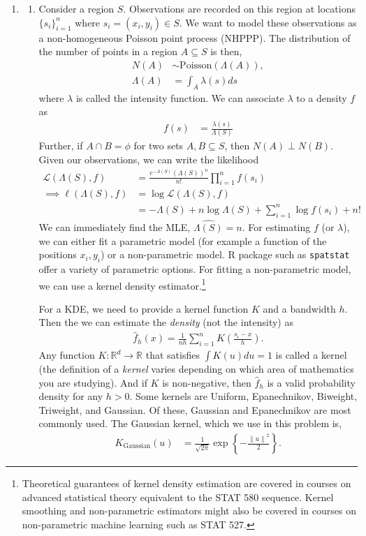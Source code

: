 \documentclass[11pt]{article}
\newcommand{\norm}[1]{\left\lVert#1\right\rVert}
\newcommand{\g}[1][G]{\mathcal{#1}}
\begin{document}
\begin{enumerate}
\clearpage
\item
\begin{enumerate}
\item Consider a region $S$. Observations are recorded on this region at locations $\{s_i\}_{i=1}^n$ where $s_i = (x_i, y_i) \in S$. We want to model these observations as a non-homogeneous Poisson point process (NHPPP). The distribution of the number of points in a region $A \subseteq S$ is then,
\begin{align*}
	N(A) &\sim \text{Poisson}(\Lambda(A)), \\
	\Lambda(A) &= \int_A \lambda(s) ds
\end{align*}
where $\lambda$ is called the intensity function. We can associate $\lambda$ to a density $f$ as
\begin{align*}
	f(s) &= \frac{\lambda(s)}{\Lambda(S)}
\end{align*}
Further, if $A \cap B = \phi$ for two sets $A, B \subseteq S$, then $N(A) \perp N(B)$. Given our observations, we can write the likelihood
\begin{align}
	\g[L](\Lambda(S), f) &= \frac{e^{-\Lambda(S)} (\Lambda(S))^n}{n!} \prod_{i=1}^n f(s_i) \label{eq:like} \\
	\implies \ell(\Lambda(S), f) &= \log \g[L](\Lambda(S), f) \nonumber \\
	&= -\Lambda(S) + n \log \Lambda(S) + \sum_{i=1}^n \log f(s_i) + n! \nonumber
\end{align}
We can immediately find the MLE, $\widehat{\Lambda(S)} = n$. For estimating $f$ (or $\lambda$), we can either fit a parametric model (for example a function of the positions $x_i, y_i$) or a non-parametric model. R package such as \texttt{spatstat} offer a variety of parametric options. For fitting a non-parametric model, we can use a kernel density estimator.\footnote{Theoretical guarantees of kernel density estimation are covered in courses on advanced statistical theory equivalent to the STAT 580 sequence. Kernel smoothing and non-parametric estimators might also be covered in courses on non-parametric machine learning such as STAT 527.}

For a KDE, we need to provide a kernel function $K$ and a bandwidth $h$. Then the we can estimate the \textit{density} (not the intensity) as
\begin{align*}
	\widehat{f}_h(x) = \frac{1}{nh} \sum_{i=1}^n K \left( \frac{s_i - x}{h} \right).
\end{align*}
Any function $K: \mathbb{R}^d \to \mathbb{R}$ that satisfies $\int K(u) du = 1$ is called a kernel (the definition of a \textit{kernel} varies depending on which area of mathematics you are studying). And if $K$ is non-negative, then $\widehat{f}_h$ is a valid probability density for any $h > 0$. Some kernels are Uniform, Epanechnikov, Biweight, Triweight, and Gaussian. Of these, Gaussian and Epanechnikov are most commonly used. The Gaussian kernel, which we use in this problem is,
\begin{align*}
	K_{\text{Gaussian}}(u) &= \frac{1}{\sqrt{2 \pi}} \exp \left\{-\frac{\norm{u}^2}{2} \right\}.
\end{align*}


\end{enumerate}
\end{enumerate}
\end{document}
